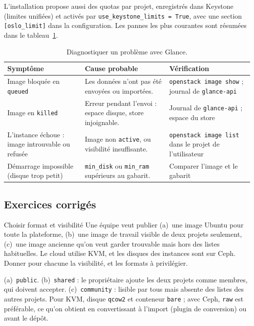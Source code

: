 L'installation propose aussi des quotas par projet, enregistrés dans Keystone (limites unifiées) et activés par
\texttt{use\_keystone\_limits = True}, avec une section \texttt{[oslo\_limit]} dans la configuration. Les pannes les plus courantes sont résumées
dans le tableau~\ref{tab:gl-pannes}.

\begin{table}[!ht]
\centering
\renewcommand{\arraystretch}{1.3}
\begin{tabular}{@{}>{\raggedright\arraybackslash}p{4.6cm}>{\raggedright\arraybackslash}p{5.6cm}>{\raggedright\arraybackslash}p{5.3cm}@{}}
\toprule
\textbf{Symptôme} & \textbf{Cause probable} & \textbf{Vérification} \\
\midrule
Image bloquée en \texttt{queued} & Les données n'ont pas été envoyées ou importées. & \texttt{openstack image show} ; journal de \texttt{glance-api} \\
Image en \texttt{killed} & Erreur pendant l'envoi : espace disque, store injoignable. & Journal de \texttt{glance-api} ; espace du store \\
L'instance échoue : image introuvable ou refusée & Image non \texttt{active}, ou visibilité insuffisante. & \texttt{openstack image list} dans le projet de l'utilisateur \\
Démarrage impossible (disque trop petit) & \texttt{min\_disk} ou \texttt{min\_ram} supérieurs au gabarit. & Comparer l'image et le gabarit \\
\bottomrule
\end{tabular}
\caption{Diagnostiquer un problème avec Glance.}
\label{tab:gl-pannes}
\end{table}

\subsection{Exercices corrigés}\label{sec:gl-exercices}

\begin{exercice}{Choisir format et visibilité}\label{ex:gl-formats}
Une équipe veut publier (a)~une image Ubuntu pour toute la plateforme, (b)~une image de travail visible de deux projets
seulement, (c)~une image ancienne qu'on veut garder trouvable mais hors des listes habituelles. Le cloud utilise KVM,
et les disques des instances sont sur Ceph. Donner pour chacune la visibilité, et les formats à privilégier.
\end{exercice}
\begin{correction}
(a)~\texttt{public}. (b)~\texttt{shared} : le propriétaire ajoute les deux projets comme membres, qui doivent accepter.
(c)~\texttt{community} : lisible par tous mais absente des listes des autres projets. Pour KVM, disque \texttt{qcow2} et conteneur
\texttt{bare} ; avec Ceph, \texttt{raw} est préférable, ce qu'on obtient en convertissant à l'import (plugin de conversion) ou
avant le dépôt.
\end{correction}

